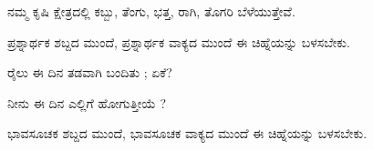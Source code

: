 \vspace{2.5pt plus 3pt minus 0.5pt}\noindent\hspace*{1.2em}\hspace{0.55em}ನಮ್ಮ ಕೃಷಿ ಕ್ಷೇತ್ರದಲ್ಲಿ ಕಬ್ಬು, ತೆಂಗು, ಭತ್ತ, ರಾಗಿ, ತೊಗರಿ ಬೆಳೆಯುತ್ತೇವೆ.\par

\vspace{4pt plus 4pt minus 1pt}\hspace{0.5em}ಪ್ರಶ್ನಾರ್ಥಕ ಶಬ್ದದ ಮುಂದೆ, ಪ್ರಶ್ನಾರ್ಥಕ ವಾಕ್ಯದ ಮುಂದೆ ಈ ಚಿಹ್ನೆಯನ್ನು ಬಳಸಬೇಕು.\par

\noindent\hspace*{1.2em}\hspace{0.6em}ರೈಲು ಈ ದಿನ ತಡವಾಗಿ ಬಂದಿತು ; ಏಕೆ?\par

\noindent\hspace*{2.2em}ನೀನು ಈ ದಿನ ಎಲ್ಲಿಗೆ ಹೋಗುತ್ತೀಯೆ ?\par

\vspace{4pt plus 4pt minus 1pt}\hspace{0.5em}ಭಾವಸೂಚಕ ಶಬ್ದದ ಮುಂದೆ, ಭಾವಸೂಚಕ ವಾಕ್ಯದ ಮುಂದೆ ಈ ಚಿಹ್ನೆಯನ್ನು ಬಳಸಬೇಕು.\par
